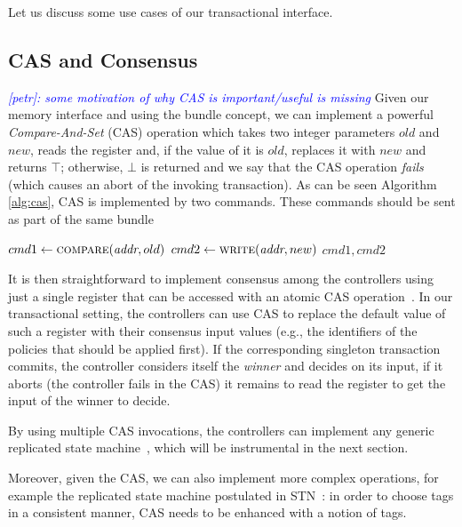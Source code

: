 \documentclass[conference]{sigcomm-alternate}
\newcommand{\cas}{CAS\xspace}
\newcommand{\compare}{compare\xspace}
\newcommand{\memwrite}{write\xspace}
\newcommand{\addr}{\emph{addr}\xspace}
\newcommand{\petr}[1]{\textit{\textcolor{blue}{[petr]: #1}}} %
\begin{document}
Let us discuss some use cases of our transactional interface.

\subsection{CAS and Consensus}
\petr{ some motivation of why CAS is important/useful is missing}
Given our memory interface and using the bundle concept, we can implement
a powerful \emph{Compare-And-Set} (CAS) operation which takes two integer parameters
$\textit{old}$ and $\textit{new}$, reads the register and, if the
value of it is $\textit{old}$, replaces it with $\textit{new}$ and
returns $\top$; otherwise, $\bot$ is returned and
we say that the CAS operation \emph{fails} (which causes an abort of
the invoking transaction). As can be seen Algorithm \ref{alg:cas}, CAS is implemented by two commands. These commands should be sent as part of the same bundle

\begin{algorithm}[h]
    \caption{$\textit{\cas}(\addr, old,new)$}
    \label{alg:cas}
    \begin{algorithmic}[1]

    		\State $cmd1\gets \textsc{\compare}(\addr, old) $
    		\State $cmd2\gets \textsc{\memwrite}(\addr, new) $
			\Return $cmd1,cmd2$
    \end{algorithmic}
\end{algorithm}

It is then straightforward to implement consensus among the controllers
using just a single register that can be accessed with an atomic CAS
operation~\cite{Her91}. In our transactional setting, the controllers
can use CAS to replace the default value of such a register
with their consensus input values (e.g., the identifiers of the
policies that should be applied first). If the corresponding
singleton transaction commits, the controller considers itself
the \emph{winner} and decides on its input, if
it aborts (the controller fails in the CAS) it remains to read the register to get the input of the
winner to decide.

By using multiple CAS invocations, the controllers can implement any
generic replicated state machine~\cite{Her91,Lam98}, which will be instrumental in the
next section.

Moreover, given the CAS, we can also implement more complex operations,
for example the replicated state machine postulated in STN~\cite{stn}:
in order to choose tags in a consistent manner, CAS needs to be enhanced
with a notion of tags.
\end{document}
